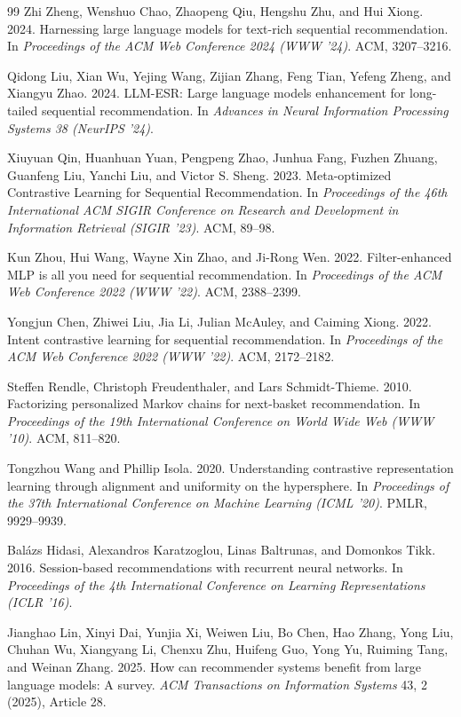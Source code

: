﻿\documentclass{article}
\begin{document}
\begin{thebibliography}{99}
Zhi Zheng, Wenshuo Chao, Zhaopeng Qiu, Hengshu Zhu, and Hui Xiong. 2024.
Harnessing large language models for text-rich sequential recommendation.
In \textit{Proceedings of the ACM Web Conference 2024 (WWW '24)}. ACM, 3207--3216.

Qidong Liu, Xian Wu, Yejing Wang, Zijian Zhang, Feng Tian, Yefeng Zheng, and Xiangyu Zhao. 2024.
LLM-ESR: Large language models enhancement for long-tailed sequential recommendation.
In \textit{Advances in Neural Information Processing Systems 38 (NeurIPS '24)}.

Xiuyuan Qin, Huanhuan Yuan, Pengpeng Zhao, Junhua Fang, Fuzhen Zhuang, Guanfeng Liu, Yanchi Liu, and Victor S. Sheng. 2023.
Meta-optimized Contrastive Learning for Sequential Recommendation.
In \textit{Proceedings of the 46th International ACM SIGIR Conference on Research and Development in Information Retrieval (SIGIR '23)}. ACM, 89--98.

Kun Zhou, Hui Wang, Wayne Xin Zhao, and Ji-Rong Wen. 2022.
Filter-enhanced MLP is all you need for sequential recommendation.
In \textit{Proceedings of the ACM Web Conference 2022 (WWW '22)}. ACM, 2388--2399.

Yongjun Chen, Zhiwei Liu, Jia Li, Julian McAuley, and Caiming Xiong. 2022.
Intent contrastive learning for sequential recommendation.
In \textit{Proceedings of the ACM Web Conference 2022 (WWW '22)}. ACM, 2172--2182.

Steffen Rendle, Christoph Freudenthaler, and Lars Schmidt-Thieme. 2010.
Factorizing personalized Markov chains for next-basket recommendation.
In \textit{Proceedings of the 19th International Conference on World Wide Web (WWW '10)}. ACM, 811--820.

Tongzhou Wang and Phillip Isola. 2020.
Understanding contrastive representation learning through alignment and uniformity on the hypersphere.
In \textit{Proceedings of the 37th International Conference on Machine Learning (ICML '20)}. PMLR, 9929--9939.

Bal\'azs Hidasi, Alexandros Karatzoglou, Linas Baltrunas, and Domonkos Tikk. 2016.
Session-based recommendations with recurrent neural networks.
In \textit{Proceedings of the 4th International Conference on Learning Representations (ICLR '16)}.

Jianghao Lin, Xinyi Dai, Yunjia Xi, Weiwen Liu, Bo Chen, Hao Zhang, Yong Liu, Chuhan Wu, Xiangyang Li, Chenxu Zhu, Huifeng Guo, Yong Yu, Ruiming Tang, and Weinan Zhang. 2025.
How can recommender systems benefit from large language models: A survey.
\textit{ACM Transactions on Information Systems} 43, 2 (2025), Article 28.


\end{thebibliography}
\end{document}
